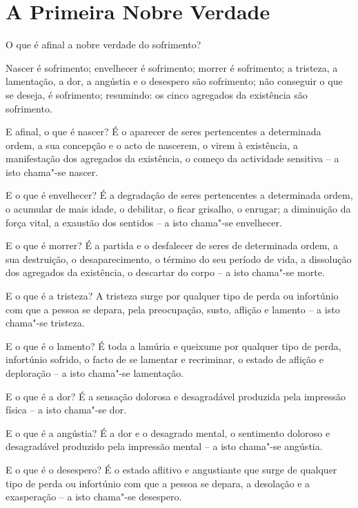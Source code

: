 
\chapter{A Primeira Nobre Verdade}


O que é afinal a nobre verdade do sofrimento?

Nascer é sofrimento; envelhecer é sofrimento; morrer é sofrimento; a tristeza, a
lamentação, a dor, a angústia e o desespero são sofrimento; não conseguir o que
se deseja, é sofrimento; resumindo: os cinco agregados da existência são
sofrimento.

E afinal, o que é nascer? É o aparecer de seres pertencentes a determinada
ordem, a sua concepção e o acto de nascerem, o virem à existência, a
manifestação dos agregados da existência, o começo da actividade sensitiva -- a
isto chama"-se nascer.

E o que é envelhecer? É a degradação de seres pertencentes a determinada ordem,
o acumular de mais idade, o debilitar, o ficar grisalho, o enrugar; a diminuição
da força vital, a exaustão dos sentidos -- a isto chama"-se envelhecer.

E o que é morrer? É a partida e o desfalecer de seres de determinada ordem, a
sua destruição, o desaparecimento, o término do seu período de vida, a
dissolução dos agregados da existência, o descartar do corpo -- a isto chama"-se
morte.

E o que é a tristeza? A tristeza surge por qualquer tipo de perda ou infortúnio
com que a pessoa se depara, pela preocupação, susto, aflição e lamento -- a isto
chama"-se tristeza.

E o que é o lamento? É toda a lamúria e queixume por qualquer tipo de perda,
infortúnio sofrido, o facto de se lamentar e recriminar, o estado de aflição e
deploração -- a isto chama"-se lamentação.

E o que é a dor? É a sensação dolorosa e desagradável produzida pela impressão
física -- a isto chama"-se dor.

E o que é a angústia? É a dor e o desagrado mental, o sentimento doloroso e
desagradável produzido pela impressão mental -- a isto chama"-se angústia.

E o que é o desespero? É o estado aflitivo e angustiante que surge de qualquer
tipo de perda ou infortúnio com que a pessoa se depara, a desolação e a
exasperação -- a isto chama"-se desespero.

